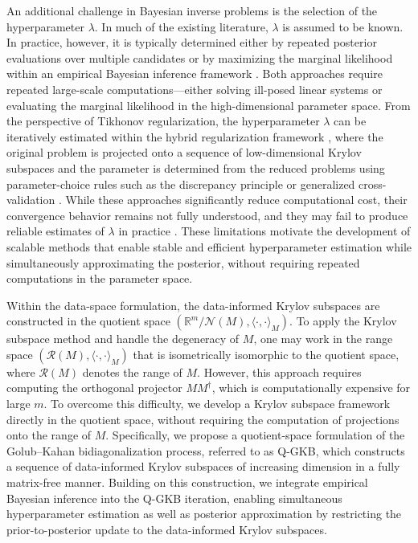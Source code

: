\documentclass[]{myarticle}
\begin{document}
An additional challenge in Bayesian inverse problems is the selection of the hyperparameter $\lambda$. In much of the existing literature, $\lambda$ is assumed to be known. In practice, however, it is typically determined either by repeated posterior evaluations over multiple candidates or by maximizing the marginal likelihood within an empirical Bayesian inference framework \cite{carlin1997bayes,petrone2014bayes,rousseau2017asymptotic}. Both approaches require repeated large-scale computations---either solving ill-posed linear systems or evaluating the marginal likelihood in the high-dimensional parameter space. From the perspective of Tikhonov regularization, the hyperparameter $\lambda$ can be iteratively estimated within the hybrid regularization framework \cite{Chung2017,saibaba2020efficient,li2024preconditioned,chung2024computational}, where the original problem is projected onto a sequence of low-dimensional Krylov subspaces and the parameter is determined from the reduced problems using parameter-choice rules such as the discrepancy principle or generalized cross-validation \cite{Kilmer2001,Chungnagy2008}. While these approaches significantly reduce computational cost, their convergence behavior remains not fully understood, and they may fail to produce reliable estimates of $\lambda$ in practice \cite{Chungnagy2008,Renaut2017,li2025projected}. These limitations motivate the development of scalable methods that enable stable and efficient hyperparameter estimation while simultaneously approximating the posterior, without requiring repeated computations in the parameter space.

Within the data-space formulation, the data-informed Krylov subspaces are constructed in the quotient space $(\mathbb R^m/\mathcal N(M),\langle\cdot,\cdot\rangle_M)$. To apply the Krylov subspace method and handle the degeneracy of $M$, one may work in the range space $(\mathcal{R}(M), \langle\cdot,\cdot \rangle_{M})$ that is isometrically isomorphic to the quotient space, where $\mathcal{R}(M)$ denotes the range of $M$. However, this approach requires computing the orthogonal projector $MM^{\dagger}$, which is computationally expensive for large $m$. To overcome this difficulty, we develop a Krylov subspace framework directly in the quotient space, without requiring the computation of projections onto the range of $M$. Specifically, we propose a quotient-space formulation of the Golub--Kahan bidiagonalization process, referred to as Q-GKB, which constructs a sequence of data-informed Krylov subspaces of increasing dimension in a fully matrix-free manner. Building on this construction, we integrate empirical Bayesian inference into the Q-GKB iteration, enabling simultaneous hyperparameter estimation as well as posterior approximation by restricting the prior-to-posterior update to the data-informed Krylov subspaces. 
\end{document}
